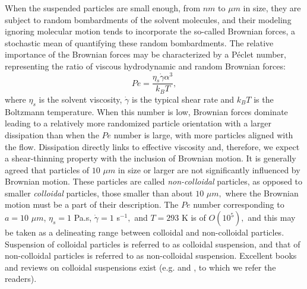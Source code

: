 \documentclass[english,fleqn,allpages]{ISTE_science}[2018/07/30]
\begin{document}
When the suspended particles are small enough,  from $nm$ to $\mu m$ in
size, they are subject to random bombardments of the solvent molecules,
and their modeling ignoring molecular motion tends to incorporate
the so-called Brownian forces, a stochastic mean of quantifying these
random bombardments. The relative importance of the Brownian forces
may be characterized by a Péclet number, representing the ratio of
viscous hydrodynamic and random Brownian forces:
\begin{equation}
Pe=\frac{\eta_{s}\dot{\gamma}\alpha^{3}}{k_{B}T},
\end{equation}
where $\eta_{s}$ is the solvent viscosity, $\dot{\gamma}$ is the
typical shear rate and $k_{B}T$ is the Boltzmann temperature. When
this number is low, Brownian forces dominate leading to a relatively
more randomized particle orientation with a larger dissipation than
when the $Pe$ number is large, with more particles aligned with the flow.
Dissipation directly links to effective viscosity and, therefore,
we expect a shear-thinning property with the inclusion of Brownian motion.
It is generally agreed \cite{Mewis} that particles of $10$ $\mu m$ in
size or larger are not  significantly influenced by Brownian
motion. These particles are called \textit{non-colloidal} particles,
as opposed to smaller \textit{colloidal} particles, those smaller
than about $10$ $\mu m,$ where the Brownian motion must be a part
of their description. The $Pe$ number corresponding to $a=10$ $\mu m$,
$\eta_{s}=1$ Pa.s, $\dot{\gamma}=1$ s$^{-1},$ and $T=293$ K is of 
$O\left(10^{5}\right),$ and this may be taken as a delineating range
between colloidal and non-colloidal particles. Suspension of colloidal
particles is referred to as colloidal suspension, and that of non-colloidal
particles is referred to as non-colloidal suspension. Excellent books
and reviews on colloidal suspensions exist (e.g. \cite{Mewis} and
\cite{Morris}, to which we refer the readers).
\end{document}
